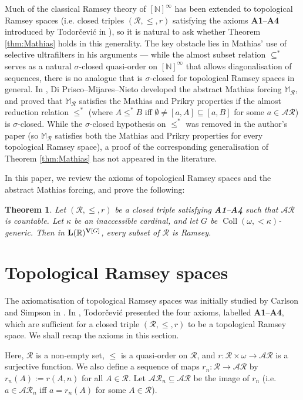 \documentclass[10pt,a4paper]{amsart}
\theoremstyle{plain}
\numberwithin{equation}{section}
\newtheorem{theorem}{Theorem}[section]
\theoremstyle{definition}
\newcommand{\func}{\operatorname}
\newcommand{\R}{\mathbb{R}}
\newcommand{\N}{\mathbb{N}}
\newcommand{\cal}{\mathcal}
\renewcommand{\bf}{\mathbf}
\newcommand{\Coll}{\func{Coll}}
\newcommand{\V}{\bf{V}}
\DeclareRobustCommand{\L}{\ifmmode\mathbf{L}\else\strokeL\fi}
\begin{document}
Much of the classical Ramsey theory of $[\N]^\infty$ has been extended to topological Ramsey spaces (i.e. closed triples $(\cal{R},\leq,r)$ satisfying the axioms \textbf{A1}--\textbf{A4} introduced by Todor\v{c}evi\'{c} in \cite{T10}), so it is natural to ask whether Theorem \ref{thm:Mathias} holds in this generality. The key obstacle lies in Mathias' use of selective ultrafilters in his arguments --- while the almost subset relation $\subseteq^*$ serves as a natural $\sigma$-closed quasi-order on $[\N]^\infty$ that allows diagonalisation of sequences, there is no analogue that is $\sigma$-closed for topological Ramsey spaces in general. In \cite{DMN15}, Di Prisco--Mijares--Nieto developed the abstract Mathias forcing $\mathbb{M}_\cal{R}$, and proved that $\mathbb{M}_\cal{R}$ satisfies the Mathias and Prikry properties if the almost reduction relation $\leq^*$ (where $A \leq^*B$ iff $\emptyset \neq [a,A] \subseteq [a,B]$ for some $a \in \cal{AR}$) is $\sigma$-closed. While the $\sigma$-closed hypothesis on $\leq^*$ was removed in the author's paper \cite{Y25} (so $\mathbb{M}_\cal{R}$ satisfies both the Mathias and Prikry properties for every topological Ramsey space), a proof of the corresponding generalisation of Theorem \ref{thm:Mathias} has not appeared in the literature.

In this paper, we review the axioms of topological Ramsey spaces and the abstract Mathias forcing, and prove the following:

\begin{theorem}
\label{thm:main}
    Let $(\cal{R},\leq,r)$ be a closed triple satisfying \textbf{A1}--\textbf{A4} such that $\cal{AR}$ is countable. Let $\kappa$ be an inaccessible cardinal, and let $G$ be $\Coll(\omega,{<}\kappa)$-generic. Then in $\L(\R)^{\V[G]}$, every subset of $\cal{R}$ is Ramsey.
\end{theorem}

\section{Topological Ramsey spaces}
\label{sec:TRS}
The axiomatisation of topological Ramsey spaces was initially studied by Carlson and Simpson in \cite{CS90}. In \cite{T10}, Todor\v{c}evi\'{c} presented the four axioms, labelled \textbf{A1}--\textbf{A4}, which are sufficient for a closed triple $(\cal{R},\leq,r)$ to be a topological Ramsey space. We shall recap the axioms in this section.

Here, $\cal{R}$ is a non-empty set, $\leq$ is a quasi-order on $\cal{R}$, and $r : \cal{R} \times \omega \to \cal{AR}$ is a surjective function. We also define a sequence of maps $r_n : \cal{R} \to \cal{AR}$ by $r_n(A) := r(A,n)$ for all $A \in \cal{R}$. Let $\cal{AR}_n \subseteq \cal{AR}$ be the image of $r_n$ (i.e. $a \in \cal{AR}_n$ iff $a = r_n(A)$ for some $A \in \cal{R}$).
\end{document}
